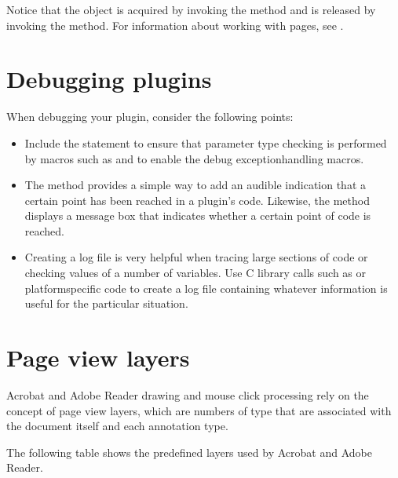 \documentclass[letterpaper,12pt,english,openany,oneside]{sphinxmanual}
\begin{document}
Notice that the  object is acquired by invoking the  method and is released by invoking the  method. For information about working with pages, see .


\section{Debugging plugins}
\label{\detokenize{Plugins_Pimech:debugging-plugins}}
When debugging your plugin, consider the following points:
\begin{itemize}
\item {} 
Include the  statement to ensure that parameter type checking is performed by macros such as  and to enable the debug exception\sphinxhyphen{}handling macros.

\item {} 
The  method provides a simple way to add an audible indication that a certain point has been reached in a plugin’s code. Likewise, the  method displays a message box that indicates whether a certain point of code is reached.

\item {} 
Creating a log file is very helpful when tracing large sections of code or checking values of a number of variables. Use C library calls such as  or platform\sphinxhyphen{}specific code to create a log file containing whatever information is useful for the particular situation.

\end{itemize}


\section{Page view layers}
\label{\detokenize{Plugins_Pimech:page-view-layers}}
Acrobat and Adobe Reader drawing and mouse click processing rely on the concept of page view layers, which are numbers of type  that are associated with the document itself and each annotation type.

The following table shows the predefined layers used by Acrobat and Adobe Reader.
\end{document}
